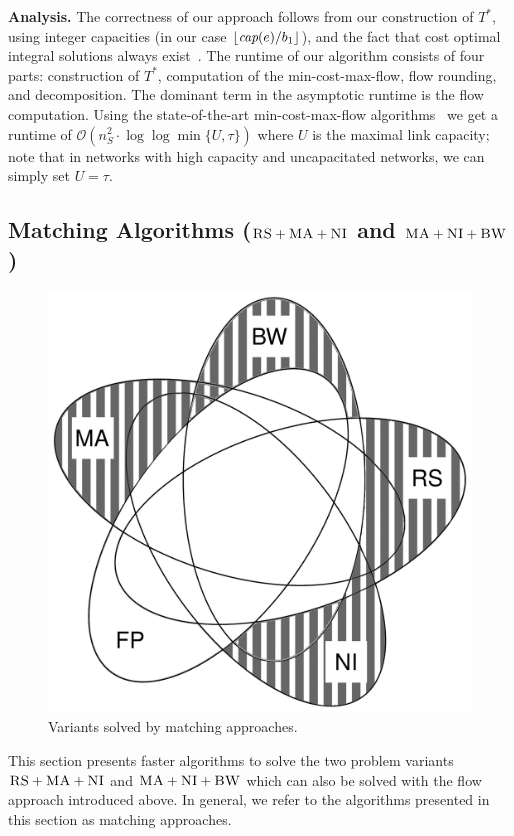 \documentclass[9pt]{sigcomm-alternate}
\newcommand{\capacity}{\emph{cap}}
\newcommand{\CC}{\textsc{NI}}
\newcommand{\RS}{\textsc{RS}}
\newcommand{\BW}{\textsc{BW}}
\newcommand{\MA}{\textsc{MA}}
\newcommand{\Tree}{\ensuremath{T}}
\newcommand{\CostTrans}{\ensuremath{b_1}}
\begin{document}
\textbf{Analysis.}
The correctness of our approach follows from our construction
of $\Tree^*$, using integer capacities (in our case $\lfloor\capacity(e)/\CostTrans\rfloor$),
and the fact that cost optimal integral solutions always exist~\cite{flow-book}.
The runtime of our algorithm consists of four parts: construction of $\Tree^*$,
computation of the min-cost-max-flow, flow rounding, and decomposition. The
dominant term in the asymptotic runtime is the flow computation.
Using the state-of-the-art min-cost-max-flow
algorithms~\cite{mincostmaxflow-1,mincostmaxflow-2}
we get a runtime of $\mathcal{O}(n_S^2 \cdot \log\log \min \{U,\tau\})$
where $U$ is the maximal link capacity; note that in networks with high capacity
and uncapacitated networks, we can simply set $U=\tau$.


\subsection{Matching Algorithms ($\RS+\MA+\CC$ and $\MA+\CC+\BW$)}\label{ssec:match}

\begin{figure}
\includegraphics[width=0.48\columnwidth]{figs/venn_matching.pdf}
\caption{Variants solved by matching approaches.}
\label{fig:venn_match}
\end{figure}

This section presents faster algorithms to solve the two problem variants
$\RS+\MA+\CC$ and $\MA+\CC+\BW$ which can also be solved with the flow approach
introduced above.
In general, we refer to the algorithms presented in this section
as matching approaches.
\end{document}
